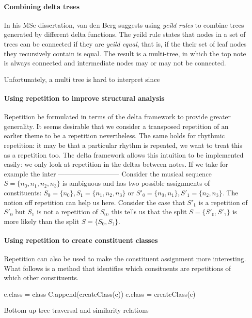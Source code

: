 \documentclass[a4paper,10pt]{article}
\begin{document}
\paragraph*{Combining delta trees} 

In his MSc dissertation, van den Berg suggests using \textit{yeild rules} to combine trees generated by different delta functions. The yeild rule states that nodes in a set of trees can be connected if they are \textit{yeild equal}, that is, if the their set of leaf nodes they recursively contain is equal. The result is a multi-tree, in which the top note is always connected and intermediate nodes may or may not be connected. 

Unfortunately, a multi tree is hard to interpret since 

\paragraph*{Using repetition to improve structural analysis}

Repetition be formulated in terms of the delta framework to provide greater generality. It seems desirable that we consider a transposed repetition of an earlier theme to be a repetition nevertheless. The same holds for rhythmic repetition: it may be that a particular rhythm is repeated, we want to treat this as a repetition too. The delta framework allows this intuition to be implemented easily: we only look at repetition in the deltas between notes. If we take for example the inter
---------------------------
Consider the musical sequence $S = \{n_0, n_1, n_2, n_3\}$ is ambiguous and has two possible assignments of constituents: $S_0 = \{n_0\}, S_1 = \{n_1, n_2, n_3\}$ or $S'_0 = \{n_0, n_1\}, S'_1 = \{n_2, n_3\}$. The notion off repetition can help us here. Consider the case that $S'_1$ is a repetition of $S'_0$ but $S_1$ is not a repetition of $S_0$, this tells us that the split $S = \{S'_0, S'_1\}$ is more likely than the split $S = \{S_0, S_1\}$.

\paragraph*{Using repetition to create constituent classes}

Repetition can also be used to make the constituent assignment more interesting. What follows is a method that identifies which consituents are repetitions of which other constituents.

\begin{algorithm}
\begin{algorithmic}
        \STATE c.class = class
      \ENDIF
    \ENDFOR
      \STATE C.append(createClass(c))
      \STATE c.class = createClass(c)
    \ENDIF
  \ENDFOR
\ENDFOR
\end{algorithmic}
\caption{Bottom up tree traversal and similarity relations}
\end{algorithm}
\end{document}
